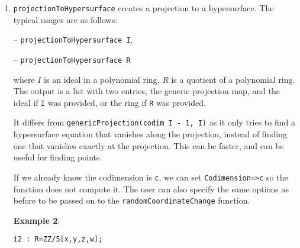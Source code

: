 \documentclass[11pt]{amsart}
\theoremstyle{definition}
\newtheorem{example}{Example}[section]
\begin{document}
\begin{enumerate}
\begin{example}
	{{\small\color{blue}
	\begin{verbatim}
i1 : R=ZZ/5[x,y,z,w];

i2 : I = ideal(x,y^2,w^3+x^2);

i3 : genericProjection(2,R/I)	

                            ZZ                          ZZ
                            --[z, w]                    --[z, w]                        
                R           5                           5
o3 = (map(----------------,--------,{2y - w, - y - z}), --------)                       
             2   3    2        4                            4
        (x, y , w  + x )      z                            z

o3 : Sequence
	\end{verbatim}
	}}
\end{example}
	

This method works by calling {\tt randomCoordinateChange} (see ) before dropping some variables.  It passes the options {\tt Replacement}, {\tt MaxCoordinatesToReplace}, {\tt Homogeneous} to that function.

\vspace{1em} 
\item {\tt projectionToHypersurface} creates a projection to a hypersurface. The typical usages are as follows: 

\vspace{1em}
-- {\tt projectionToHypersurface I},

-- {\tt projectionToHypersurface R} 

\vspace{1em}
\noindent where $I$ is an ideal in a polynomial ring, $R$ is a quotient of a polynomial ring. The output is
a list with two entries, the generic projection map, and the ideal if {\tt I} was provided, or the ring if {\tt R} was provided.

It differs from {\tt genericProjection(codim I - 1, I)} as it only tries to find a hypersurface equation that vanishes along the projection, instead of finding one that vanishes exactly at the projection.  This can be faster, and can be useful for finding points. 

If we already know the codimension is {\tt c}, we can set {\tt Codimension=>c} so the function does not compute it. The user can also specify the same options as before to be passed on to the {\tt randomCoordinateChange} function.

\begin{example}
	{{\small\color{blue}
	\begin{verbatim}
i2 : R=ZZ/5[x,y,z,w];


\end{verbatim}}}
\end{example}
\end{enumerate}
\end{document}
